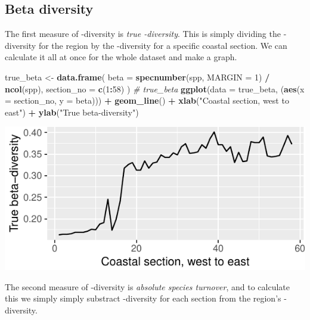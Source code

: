\documentclass[10pt,a4,]{article}
\newenvironment{Shaded}{\begin{snugshade}}{\end{snugshade}}
\newcommand{\CommentTok}[1]{\textcolor[rgb]{0.56,0.35,0.01}{\textit{#1}}}
\newcommand{\DataTypeTok}[1]{\textcolor[rgb]{0.13,0.29,0.53}{#1}}
\newcommand{\DecValTok}[1]{\textcolor[rgb]{0.00,0.00,0.81}{#1}}
\newcommand{\KeywordTok}[1]{\textcolor[rgb]{0.13,0.29,0.53}{\textbf{#1}}}
\newcommand{\NormalTok}[1]{#1}
\newcommand{\OperatorTok}[1]{\textcolor[rgb]{0.81,0.36,0.00}{\textbf{#1}}}
\newcommand{\StringTok}[1]{\textcolor[rgb]{0.31,0.60,0.02}{#1}}
\begin{document}
\subsection{Beta diversity}

The first measure of \textbeta-diversity is \emph{true
\textbeta-diversity}. This is simply dividing the \textgamma-diversity
for the region by the \textalpha-diversity for a specific coastal
section. We can calculate it all at once for the whole dataset and make
a graph.

\begin{Shaded}
\begin{Highlighting}[]
\NormalTok{true\_beta <{-}}\StringTok{ }\KeywordTok{data.frame}\NormalTok{(}
  \DataTypeTok{beta =} \KeywordTok{specnumber}\NormalTok{(spp, }\DataTypeTok{MARGIN =} \DecValTok{1}\NormalTok{) }\OperatorTok{/}\StringTok{ }\KeywordTok{ncol}\NormalTok{(spp),}
  \DataTypeTok{section\_no =} \KeywordTok{c}\NormalTok{(}\DecValTok{1}\OperatorTok{:}\DecValTok{58}\NormalTok{)}
\NormalTok{)}
\CommentTok{\# true\_beta}
\KeywordTok{ggplot}\NormalTok{(}\DataTypeTok{data =}\NormalTok{ true\_beta, (}\KeywordTok{aes}\NormalTok{(}\DataTypeTok{x =}\NormalTok{ section\_no, }\DataTypeTok{y =}\NormalTok{ beta))) }\OperatorTok{+}
\StringTok{  }\KeywordTok{geom\_line}\NormalTok{() }\OperatorTok{+}\StringTok{ }\KeywordTok{xlab}\NormalTok{(}\StringTok{"Coastal section, west to east"}\NormalTok{) }\OperatorTok{+}\StringTok{ }\KeywordTok{ylab}\NormalTok{(}\StringTok{"True beta{-}diversity"}\NormalTok{)}
\end{Highlighting}
\end{Shaded}

\begin{center}\includegraphics{compliled_figures/unnamed-chunk-8-1} \end{center}

The second measure of \textbeta-diversity is \emph{absolute species
turnover}, and to calculate this we simply simply substract
\textalpha-diversity for each section from the region's
\textgamma-diversity.
\end{document}
